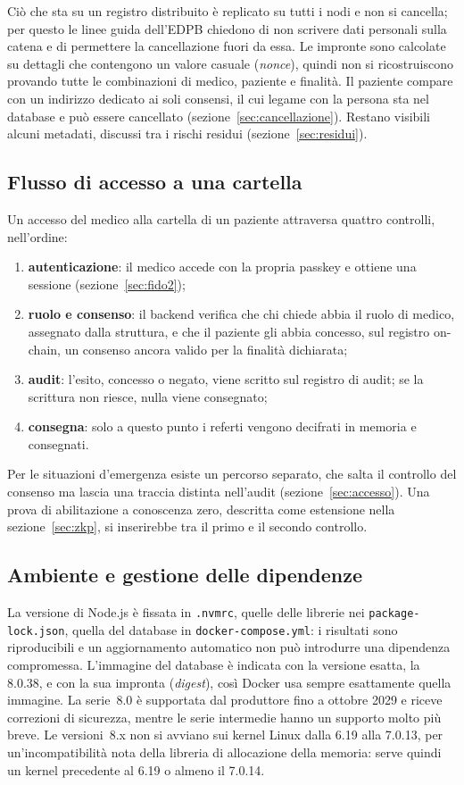 Ciò che sta su un registro distribuito è replicato su tutti i nodi e non si cancella; per questo le linee guida dell'EDPB\cite{edpb-blockchain} chiedono di non scrivere dati personali sulla catena e di permettere la cancellazione fuori da essa. Le impronte sono calcolate su dettagli che contengono un valore casuale (\emph{nonce}), quindi non si ricostruiscono provando tutte le combinazioni di medico, paziente e finalità. Il paziente compare con un indirizzo dedicato ai soli consensi, il cui legame con la persona sta nel database e può essere cancellato (sezione~\ref{sec:cancellazione}). Restano visibili alcuni metadati, discussi tra i rischi residui (sezione~\ref{sec:residui}).

\subsection{Flusso di accesso a una cartella}\label{sec:flusso}
Un accesso del medico alla cartella di un paziente attraversa quattro controlli, nell'ordine:
\begin{enumerate}
  \item \textbf{autenticazione}: il medico accede con la propria passkey e ottiene una sessione (sezione~\ref{sec:fido2});
  \item \textbf{ruolo e consenso}: il backend verifica che chi chiede abbia il ruolo di medico, assegnato dalla struttura, e che il paziente gli abbia concesso, sul registro on-chain, un consenso ancora valido per la finalità dichiarata;
  \item \textbf{audit}: l'esito, concesso o negato, viene scritto sul registro di audit; se la scrittura non riesce, nulla viene consegnato;
  \item \textbf{consegna}: solo a questo punto i referti vengono decifrati in memoria e consegnati.
\end{enumerate}
Per le situazioni d'emergenza esiste un percorso separato, che salta il controllo del consenso ma lascia una traccia distinta nell'audit (sezione~\ref{sec:accesso}). Una prova di abilitazione a conoscenza zero, descritta come estensione nella sezione~\ref{sec:zkp}, si inserirebbe tra il primo e il secondo controllo.

\subsection{Ambiente e gestione delle dipendenze}
La versione di Node.js è fissata in \texttt{.nvmrc}, quelle delle librerie nei \texttt{package-lock.json}, quella del database in \texttt{docker-compose.yml}: i risultati sono riproducibili e un aggiornamento automatico non può introdurre una dipendenza compromessa. L'immagine del database è indicata con la versione esatta, la 8.0.38, e con la sua impronta (\emph{digest}), così Docker usa sempre esattamente quella immagine. La serie~8.0 è supportata dal produttore fino a ottobre 2029 e riceve correzioni di sicurezza\cite{mongodb-lifecycle}, mentre le serie intermedie hanno un supporto molto più breve. Le versioni~8.x non si avviano sui kernel Linux dalla 6.19 alla 7.0.13, per un'incompatibilità nota della libreria di allocazione della memoria\cite{mongodb-server-121912}: serve quindi un kernel precedente al 6.19 o almeno il 7.0.14.

